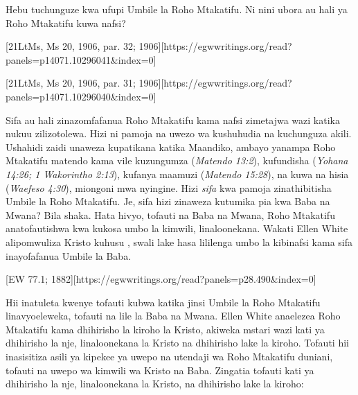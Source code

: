 Hebu tuchunguze kwa ufupi Umbile la Roho Mtakatifu. Ni nini ubora au hali ya Roho Mtakatifu kuwa nafsi?


[21LtMs, Ms 20, 1906, par. 32; 1906][https://egwwritings.org/read?panels=p14071.10296041&index=0]


[21LtMs, Ms 20, 1906, par. 31; 1906][https://egwwritings.org/read?panels=p14071.10296040&index=0]


Sifa au hali zinazomfafanua Roho Mtakatifu kama nafsi zimetajwa wazi katika nukuu zilizotolewa. Hizi ni pamoja na uwezo wa kushuhudia na kuchunguza akili. Ushahidi zaidi unaweza kupatikana katika Maandiko, ambayo yanampa Roho Mtakatifu matendo kama vile kuzungumza (\textit{Matendo 13:2}), kufundisha (\textit{Yohana 14:26; 1 Wakorintho 2:13}), kufanya maamuzi (\textit{Matendo 15:28}), na kuwa na hisia (\textit{Waefeso 4:30}), miongoni mwa nyingine. Hizi \textit{sifa} kwa pamoja zinathibitisha Umbile la Roho Mtakatifu. Je, sifa hizi zinaweza kutumika pia kwa Baba na Mwana? Bila shaka. Hata hivyo, tofauti na Baba na Mwana, Roho Mtakatifu anatofautishwa kwa kukosa umbo la kimwili, linaloonekana. Wakati Ellen White alipomwuliza Kristo kuhusu , swali lake hasa lililenga umbo la kibinafsi kama sifa inayofafanua Umbile la Baba.


[EW 77.1; 1882][https://egwwritings.org/read?panels=p28.490&index=0]


Hii inatuleta kwenye tofauti kubwa katika jinsi Umbile la Roho Mtakatifu linavyoeleweka, tofauti na lile la Baba na Mwana. Ellen White anaelezea Roho Mtakatifu kama dhihirisho la kiroho la Kristo, akiweka mstari wazi kati ya dhihirisho la nje, linaloonekana la Kristo na dhihirisho lake la kiroho. Tofauti hii inasisitiza asili ya kipekee ya uwepo na utendaji wa Roho Mtakatifu duniani, tofauti na uwepo wa kimwili wa Kristo na Baba. Zingatia tofauti kati ya dhihirisho la nje, linaloonekana la Kristo, na dhihirisho lake la kiroho:


